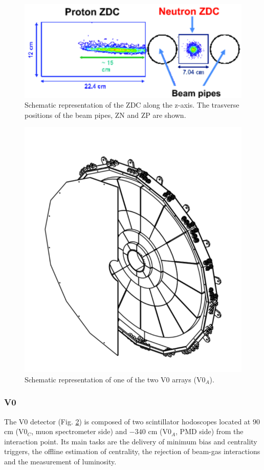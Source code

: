 \begin{figure}[!h]
\begin{center}
\includegraphics[width=.5\linewidth]{Chapters/Introduction/Figs/ZDC.pdf}
\caption{Schematic representation of the ZDC along the z-axis. The trasverse positions of the beam pipes, ZN and ZP are shown.}
\label{fig:ZDC}
\end{center}
\end{figure}

\begin{figure}[!h]
\begin{center}
\includegraphics[width=.7\linewidth]{Chapters/Introduction/Figs/V0.pdf}
\caption{Schematic representation of one of the two V0 arrays (V0$_A$).}
\label{fig:V0}
\end{center}
\end{figure}

\subsubsection{V0}
The V0 detector (Fig. \ref{fig:V0}) is composed of two scintillator hodoscopes located at $90$ cm (V0$_C$, muon spectrometer side) and $-340$ cm (V0$_A$, PMD side) from the interaction point. 
Its main tasks are the delivery of minimum bias and centrality triggers, the offline estimation of centrality, the rejection of beam-gas interactions and the measurement of luminosity.

